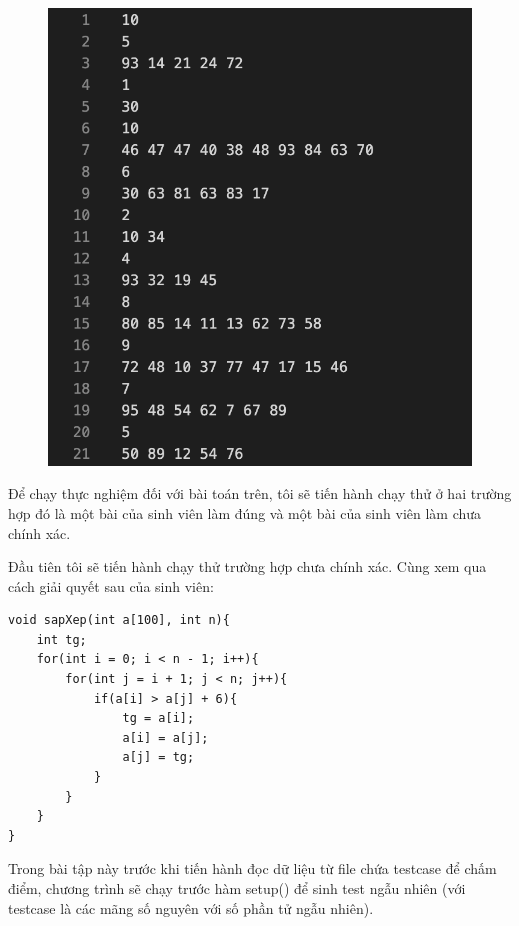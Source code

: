 \documentclass[12pt,a4paper]{article}
\begin{document}
\begin{figure}[ht]
\begin{center}
\includegraphics[scale=.3]{hinhanh/testcasearray.png}
\end{center}
\end{figure}

Để chạy thực nghiệm đối với bài toán trên, tôi sẽ tiến hành chạy thử ở hai trường hợp đó là một bài của sinh viên làm đúng và một bài của sinh viên làm chưa chính xác.

Đầu tiên tôi sẽ tiến hành chạy thử trường hợp chưa chính xác. Cùng xem qua cách giải quyết sau của sinh viên:

\begin{lstlisting}
void sapXep(int a[100], int n){
    int tg;
    for(int i = 0; i < n - 1; i++){
        for(int j = i + 1; j < n; j++){
            if(a[i] > a[j] + 6){
                tg = a[i];
                a[i] = a[j];
                a[j] = tg;        
            }
        }
    }
}
\end{lstlisting}

Trong bài tập này trước khi tiến hành đọc dữ liệu từ file chứa testcase để chấm điểm, chương trình sẽ chạy trước hàm setup() để sinh test ngẫu nhiên (với testcase là các mãng số nguyên với số phần tử ngẫu nhiên).
\end{document}

